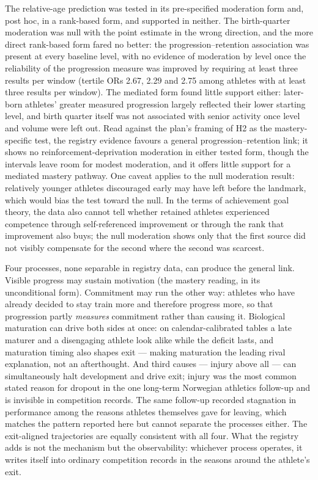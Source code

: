 \documentclass[12pt,a4paper]{article}
\begin{document}
The relative-age prediction was tested in its pre-specified moderation form and, post hoc, in a rank-based form, and supported in neither. The birth-quarter moderation was null with the point estimate in the wrong direction, and the more direct rank-based form fared no better: the progression--retention association was present at every baseline level, with no evidence of moderation by level once the reliability of the progression measure was improved by requiring at least three results per window (tertile ORs 2.67, 2.29 and 2.75 among athletes with at least three results per window). The mediated form found little support either: later-born athletes' greater measured progression largely reflected their lower starting level, and birth quarter itself was not associated with senior activity once level and volume were left out. Read against the plan's framing of H2 as the mastery-specific test, the registry evidence favours a general progression--retention link; it shows no reinforcement-deprivation moderation in either tested form, though the intervals leave room for modest moderation, and it offers little support for a mediated mastery pathway. One caveat applies to the null moderation result: relatively younger athletes discouraged early may have left before the landmark, which would bias the test toward the null. In the terms of achievement goal theory, the data also cannot tell whether retained athletes experienced competence through self-referenced improvement or through the rank that improvement also buys; the null moderation shows only that the first source did not visibly compensate for the second where the second was scarcest.

Four processes, none separable in registry data, can produce the general link. Visible progress may sustain motivation (the mastery reading, in its unconditional form). Commitment may run the other way: athletes who have already decided to stay train more and therefore progress more, so that progression partly \emph{measures} commitment rather than causing it. Biological maturation can drive both sides at once: on calendar-calibrated tables a late maturer and a disengaging athlete look alike while the deficit lasts, and maturation timing also shapes exit --- making maturation the leading rival explanation, not an afterthought. And third causes --- injury above all --- can simultaneously halt development and drive exit; injury was the most common stated reason for dropout in the one long-term Norwegian athletics follow-up \citep{enoksen2011} and is invisible in competition records. The same follow-up recorded stagnation in performance among the reasons athletes themselves gave for leaving, which matches the pattern reported here but cannot separate the processes either. The exit-aligned trajectories are equally consistent with all four. What the registry adds is not the mechanism but the observability: whichever process operates, it writes itself into ordinary competition records in the seasons around the athlete's exit.
\end{document}
